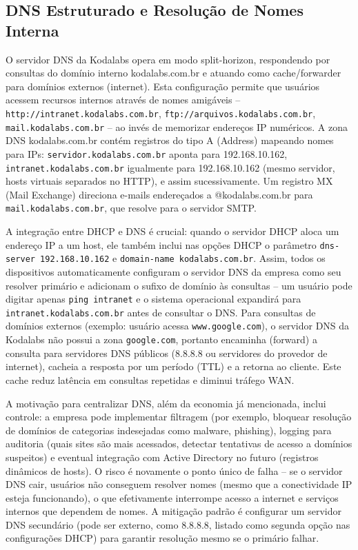 \documentclass[12pt,a4paper]{article}
\begin{document}
\subsection{DNS Estruturado e Resolução de Nomes Interna}

O servidor DNS da Kodalabs opera em modo split-horizon, respondendo por consultas do domínio interno kodalabs.com.br e atuando como cache/forwarder para domínios externos (internet). Esta configuração permite que usuários acessem recursos internos através de nomes amigáveis -- \texttt{http://intranet.kodalabs.com.br}, \texttt{ftp://arquivos.kodalabs.com.br}, \texttt{mail.kodalabs.com.br} -- ao invés de memorizar endereços IP numéricos. A zona DNS kodalabs.com.br contém registros do tipo A (Address) mapeando nomes para IPs: \texttt{servidor.kodalabs.com.br} aponta para 192.168.10.162, \texttt{intranet.kodalabs.com.br} igualmente para 192.168.10.162 (mesmo servidor, hosts virtuais separados no HTTP), e assim sucessivamente. Um registro MX (Mail Exchange) direciona e-mails endereçados a @kodalabs.com.br para \texttt{mail.kodalabs.com.br}, que resolve para o servidor SMTP.

A integração entre DHCP e DNS é crucial: quando o servidor DHCP aloca um endereço IP a um host, ele também inclui nas opções DHCP o parâmetro \texttt{dns-server 192.168.10.162} e \texttt{domain-name kodalabs.com.br}. Assim, todos os dispositivos automaticamente configuram o servidor DNS da empresa como seu resolver primário e adicionam o sufixo de domínio às consultas -- um usuário pode digitar apenas \texttt{ping intranet} e o sistema operacional expandirá para \texttt{intranet.kodalabs.com.br} antes de consultar o DNS. Para consultas de domínios externos (exemplo: usuário acessa \texttt{www.google.com}), o servidor DNS da Kodalabs não possui a zona \texttt{google.com}, portanto encaminha (forward) a consulta para servidores DNS públicos (8.8.8.8 ou servidores do provedor de internet), cacheia a resposta por um período (TTL) e a retorna ao cliente. Este cache reduz latência em consultas repetidas e diminui tráfego WAN.

A motivação para centralizar DNS, além da economia já mencionada, inclui controle: a empresa pode implementar filtragem (por exemplo, bloquear resolução de domínios de categorias indesejadas como malware, phishing), logging para auditoria (quais sites são mais acessados, detectar tentativas de acesso a domínios suspeitos) e eventual integração com Active Directory no futuro (registros dinâmicos de hosts). O risco é novamente o ponto único de falha -- se o servidor DNS cair, usuários não conseguem resolver nomes (mesmo que a conectividade IP esteja funcionando), o que efetivamente interrompe acesso a internet e serviços internos que dependem de nomes. A mitigação padrão é configurar um servidor DNS secundário (pode ser externo, como 8.8.8.8, listado como segunda opção nas configurações DHCP) para garantir resolução mesmo se o primário falhar.
\end{document}
